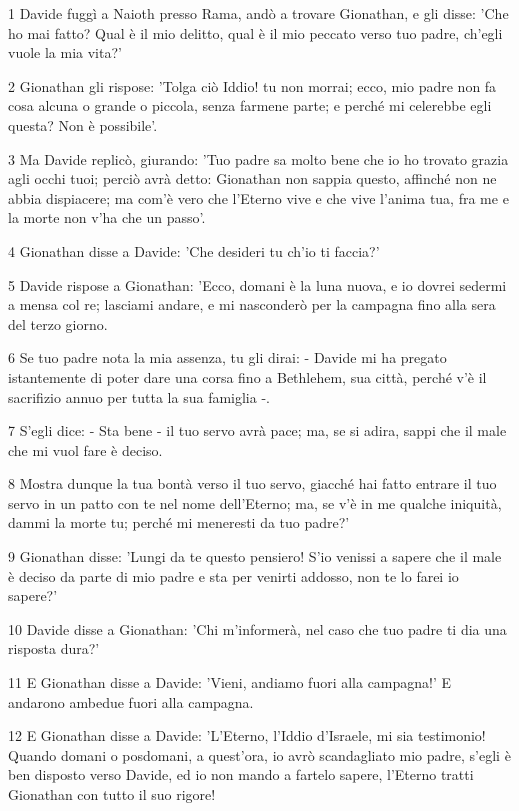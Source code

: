 \par 1 Davide fuggì a Naioth presso Rama, andò a trovare Gionathan, e gli disse: 'Che ho mai fatto? Qual è il mio delitto, qual è il mio peccato verso tuo padre, ch'egli vuole la mia vita?'
\par 2 Gionathan gli rispose: 'Tolga ciò Iddio! tu non morrai; ecco, mio padre non fa cosa alcuna o grande o piccola, senza farmene parte; e perché mi celerebbe egli questa? Non è possibile'.
\par 3 Ma Davide replicò, giurando: 'Tuo padre sa molto bene che io ho trovato grazia agli occhi tuoi; perciò avrà detto: Gionathan non sappia questo, affinché non ne abbia dispiacere; ma com'è vero che l'Eterno vive e che vive l'anima tua, fra me e la morte non v'ha che un passo'.
\par 4 Gionathan disse a Davide: 'Che desideri tu ch'io ti faccia?'
\par 5 Davide rispose a Gionathan: 'Ecco, domani è la luna nuova, e io dovrei sedermi a mensa col re; lasciami andare, e mi nasconderò per la campagna fino alla sera del terzo giorno.
\par 6 Se tuo padre nota la mia assenza, tu gli dirai: - Davide mi ha pregato istantemente di poter dare una corsa fino a Bethlehem, sua città, perché v'è il sacrifizio annuo per tutta la sua famiglia -.
\par 7 S'egli dice: - Sta bene - il tuo servo avrà pace; ma, se si adira, sappi che il male che mi vuol fare è deciso.
\par 8 Mostra dunque la tua bontà verso il tuo servo, giacché hai fatto entrare il tuo servo in un patto con te nel nome dell'Eterno; ma, se v'è in me qualche iniquità, dammi la morte tu; perché mi meneresti da tuo padre?'
\par 9 Gionathan disse: 'Lungi da te questo pensiero! S'io venissi a sapere che il male è deciso da parte di mio padre e sta per venirti addosso, non te lo farei io sapere?'
\par 10 Davide disse a Gionathan: 'Chi m'informerà, nel caso che tuo padre ti dia una risposta dura?'
\par 11 E Gionathan disse a Davide: 'Vieni, andiamo fuori alla campagna!' E andarono ambedue fuori alla campagna.
\par 12 E Gionathan disse a Davide: 'L'Eterno, l'Iddio d'Israele, mi sia testimonio! Quando domani o posdomani, a quest'ora, io avrò scandagliato mio padre, s'egli è ben disposto verso Davide, ed io non mando a fartelo sapere, l'Eterno tratti Gionathan con tutto il suo rigore!
